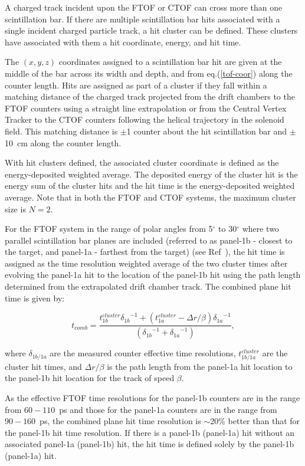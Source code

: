 \documentclass{elsart}
\begin{document}
A charged track incident upon the FTOF or CTOF can cross more than one scintillation bar. If there are multiple
scintillation bar hits associated with a single incident charged particle track, a hit cluster can be defined. These
clusters have associated with them a hit coordinate, energy, and hit time.

The $(x,y,z)$ coordinates assigned to a scintillation bar hit are given at the middle of the bar across its width
and depth, and from eq.(\ref{tof-coor}) along the counter length. Hits are assigned as part of a cluster if they
fall within a matching distance of the charged track projected from the drift chambers to the FTOF counters
using a straight line extrapolation or from the Central Vertex Tracker to the CTOF counters following the
helical trajectory in the solenoid field. This matching distance is $\pm$1 counter about the hit scintillation bar
and $\pm$10~cm along the counter length.

With hit clusters defined, the associated cluster coordinate is defined as the energy-deposited weighted average.
The deposited energy of the cluster hit is the energy sum of the cluster hits and the hit time is the energy-deposited
weighted average. Note that in both the FTOF and CTOF systems, the maximum cluster size is $N=2$.

For the FTOF system in the range of polar angles from 5$^\circ$ to 30$^\circ$ where two parallel scintillation
bar planes are included (referred to as panel-1b - closest to the target, and panel-1a - farthest from the target)
(see Ref~\cite{ftof-nim}), the hit time is assigned as the time resolution weighted average of the two cluster times
after evolving the panel-1a hit to the location of the panel-1b hit using the path length determined from the
extrapolated drift chamber track. The combined plane hit time is given by:

\begin{equation}
t_{comb} = \dfrac{ t_{1b}^{cluster} {\delta_{1b}}^{-1} + (t_{1a}^{cluster} - \Delta r/\beta) {\delta_{1a}}^{-1}}
           {\left( {\delta_{1b}}^{-1} + {\delta_{1a}}^{-1} \right)},
\end{equation}

\noindent
where $\delta_{1b/1a}$ are the measured counter effective time resolutions, $t_{1b/1a}^{cluster}$ are the cluster
hit times, and $\Delta r/\beta$ is the path length from the panel-1a hit location to the panel-1b hit location for
the track of speed $\beta$.

As the effective FTOF time resolutions for the panel-1b counters are in the range from $60-110$~ps and those
for the panel-1a counters are in the range from $90-160$~ps, the combined plane hit time resolution is $\sim$20\%
better than that for the panel-1b hit time resolution. If there is a panel-1b (panel-1a) hit without an associated
panel-1a (panel-1b) hit, the hit time is defined solely by the panel-1b (panel-1a) hit.
\end{document}
